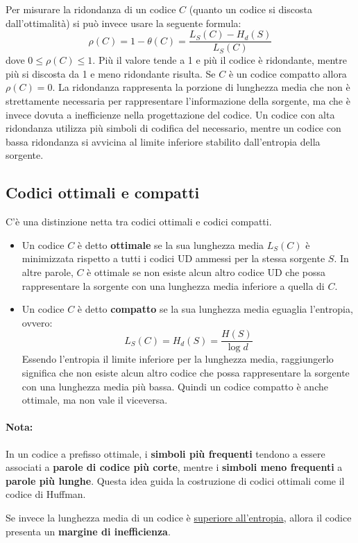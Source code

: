 \documentclass{article}
\theoremstyle{definition}
\numberwithin{equation}{section}
\begin{document}
Per misurare la ridondanza di un codice $C$ (quanto un codice si discosta dall'ottimalità) si può invece usare la seguente formula:
\[
    \rho(C) = 1- \theta(C) = \frac{L_S(C) - H_d(S)}{L_S(C)}
\]
dove $0 \leq \rho(C) \leq 1$. Più il valore tende a 1 e più il codice è ridondante, mentre più si discosta da 1 e meno ridondante risulta. Se $C$ è un codice compatto allora $\rho(C)=0$. La ridondanza rappresenta la porzione di lunghezza media che non è strettamente necessaria per rappresentare l'informazione della sorgente, ma che è invece dovuta a inefficienze nella progettazione del codice. Un codice con alta ridondanza utilizza più simboli di codifica del necessario, mentre un codice con bassa ridondanza si avvicina al limite inferiore stabilito dall'entropia della sorgente.

\subsection{Codici ottimali e compatti}
C'è una distinzione netta tra codici ottimali e codici compatti.
\begin{itemize}
    \item Un codice $C$ è detto \textbf{ottimale} se la sua lunghezza media $L_S(C)$ è minimizzata rispetto a tutti i codici UD ammessi per la stessa sorgente $S$. In altre parole, $C$ è ottimale se non esiste alcun altro codice UD che possa rappresentare la sorgente con una lunghezza media inferiore a quella di $C$.
    \item Un codice $C$ è detto \textbf{compatto} se la sua lunghezza media eguaglia l'entropia, ovvero:
          \[
              L_S(C) = H_d(S) = \frac{H(S)}{\log d}
          \]
          Essendo l'entropia il limite inferiore per la lunghezza media, raggiungerlo significa che non esiste alcun altro codice che possa rappresentare la sorgente con una lunghezza media più bassa. Quindi un codice compatto è anche ottimale, ma non vale il viceversa.
\end{itemize}
\paragraph{Nota:}
In un codice a prefisso ottimale, i \textbf{simboli più frequenti} tendono a essere associati a \textbf{parole di codice più corte}, mentre i \textbf{simboli meno frequenti} a \textbf{parole più lunghe}. Questa idea guida la costruzione di codici ottimali come il codice di Huffman.

Se invece la lunghezza media di un codice è \uline{superiore all'entropia}, allora il codice presenta un \textbf{margine di inefficienza}.
\end{document}
